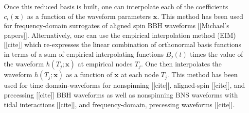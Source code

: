\documentclass[prd,aps,letter,twocolumn,floatfix,notitlepage,nofootinbib]{revtex4-1}
\def\bx{\mathbf{x}}
\begin{document}


Once this reduced basis is built, one can interpolate each of the coefficients $c_i(\bx)$ as a function of the waveform parameters $\bx$. This method has been used for frequency-domain surrogates of aligned spin BBH waveforms [[Michael's papers]]. Alternatively, one can use the empirical interpolation method (EIM) [[cite]] which re-expresses the linear combination of orthonormal basis functions in terms of a sum of empirical interpolating functions $B_j(t)$ times the value of the waveform $h(T_j; \bx)$ at empirical nodes $T_j$. One then interpolates the waveform $h(T_j; \bx)$ as a function of $\bx$ at each node $T_j$. This method has been used for time domain-waveforms for nonspinning [[cite]], aligned-spin [[cite]], and precessing [[cite]] BBH waveforms as well as nonspinning BNS waveforms with tidal interactions [[cite]], and frequency-domain, precessing waveforms [[cite]].
\end{document}

